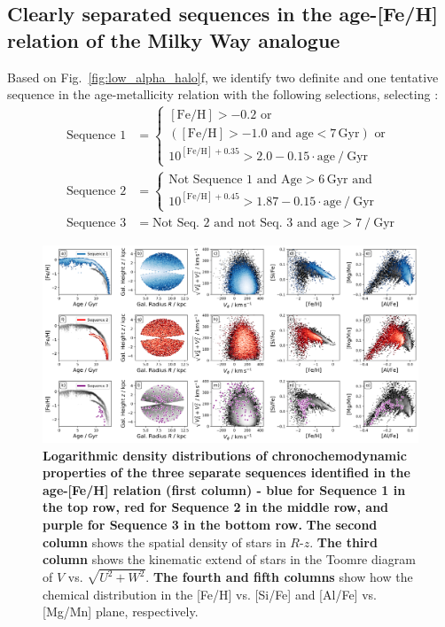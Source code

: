 \documentclass[fleqn,usenatbib]{mnras}
\begin{document}
\subsection{Clearly separated sequences in the age-[Fe/H] relation of the Milky Way analogue} \label{sec:age-feh-sequences}

Based on Fig.~\ref{fig:low_alpha_halo}f, we identify two definite and one tentative sequence in the age-metallicity relation with the following selections, selecting :
\begin{align}
    \text{Sequence~1} &= \begin{cases}
        \mathrm{[Fe/H] > -0.2} \text{ or} \\
        (\mathrm{[Fe/H]} > -1.0 \text{ and } \mathrm{age} < 7\,\mathrm{Gyr}) \text{ or} \\
        10^{\mathrm{[Fe/H]} + 0.35} > 2.0 - 0.15 \cdot \mathrm{age}~/~\mathrm{Gyr}
    \end{cases} \label{eq:sequence1} \\
    \text{Sequence~2} &= \begin{cases}
        \text{Not Sequence~1 and }\mathrm{Age} > 6\,\mathrm{Gyr} \text{ and} \\
        10^{\mathrm{[Fe/H]} + 0.45} > 1.87 - 0.15 \cdot \mathrm{age}~/~\mathrm{Gyr}
    \end{cases}  \label{eq:sequence2} \\
    \text{Sequence~3} &= \text{Not Seq.~2 and not Seq.~3 and } \mathrm{age} > 7~/~\mathrm{Gyr}  \label{eq:sequence3}
\end{align}

\begin{figure}
	\includegraphics[width=\textwidth]{figures/three_sequences_traced.png}
    \caption{
    \textbf{Logarithmic density distributions of chronochemodynamic properties of the three separate sequences identified in the age-[Fe/H] relation (first column) - blue for Sequence 1 in the top row, red for Sequence 2 in the middle row, and purple for Sequence 3 in the bottom row.
    }
    \textbf{The second column} shows the spatial density of stars in $R$-$z$.
    \textbf{The third column} shows the kinematic extend of stars in the Toomre diagram of $V$ vs. $\sqrt{U^2+W^2}$.
    \textbf{The fourth and fifth columns} show how the chemical distribution in the [Fe/H] vs. [Si/Fe] and [Al/Fe] vs. [Mg/Mn] plane, respectively.
    }
    \label{fig:three_sequences_traced}
\end{figure}
\end{document}
